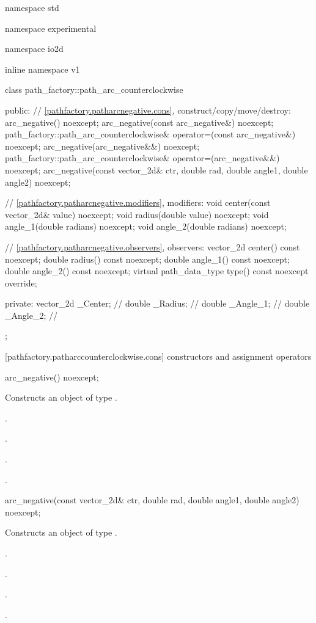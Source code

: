\begin{codeblock}
namespace std { namespace experimental { namespace io2d { inline namespace v1 {
  class path_factory::path_arc_counterclockwise {
  public:
    // \ref{pathfactory.patharcnegative.cons}, construct/copy/move/destroy:
    arc_negative() noexcept;
    arc_negative(const arc_negative&) noexcept;
    path_factory::path_arc_counterclockwise& operator=(const arc_negative&) noexcept;
    arc_negative(arc_negative&&) noexcept;
    path_factory::path_arc_counterclockwise& operator=(arc_negative&&) noexcept;
    arc_negative(const vector_2d& ctr, double rad, double angle1,
      double angle2) noexcept;

    // \ref{pathfactory.patharcnegative.modifiers}, modifiers:
    void center(const vector_2d& value) noexcept;
    void radius(double value) noexcept;
    void angle_1(double radians) noexcept;
    void angle_2(double radians) noexcept;

    // \ref{pathfactory.patharcnegative.observers}, observers:
    vector_2d center() const noexcept;
    double radius() const noexcept;
    double angle_1() const noexcept;
    double angle_2() const noexcept;
    virtual path_data_type type() const noexcept override;

  private:
    vector_2d _Center;   // \expos
    double _Radius;  // \expos
    double _Angle_1; // \expos
    double _Angle_2; // \expos
  };
} } } }
\end{codeblock}

 [pathfactory.patharccounterclockwise.cons] { constructors and assignment operators}

\begin{itemdecl}
    arc_negative() noexcept;
\end{itemdecl}
\begin{itemdescr}
	\pnum
	\effects
	Constructs an object of type .
	
	\pnum
	\postconditions
	.

	.

	.

	.
\end{itemdescr}

\begin{itemdecl}
    arc_negative(const vector_2d& ctr, double rad, double angle1,
      double angle2) noexcept;
\end{itemdecl}
\begin{itemdescr}
	\pnum
	\effects
	Constructs an object of type .
	
	\pnum
	\postconditions
	.

	.

	.

	.
\end{itemdescr}

